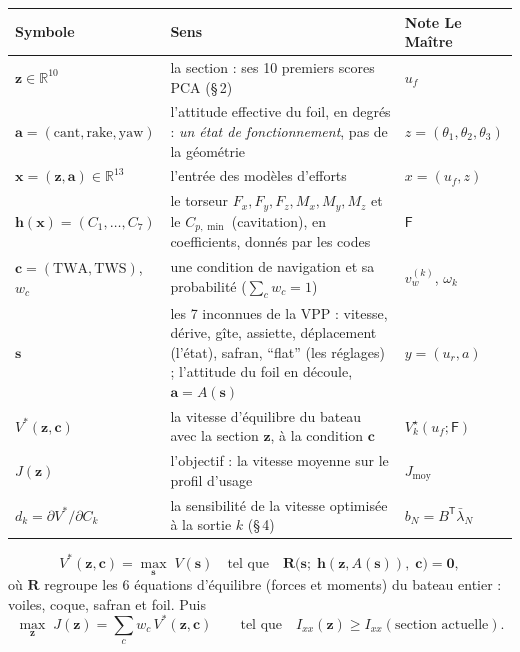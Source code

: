 \documentclass[11pt,a4paper]{article}
\newcommand{\vx}{\bm{x}}
\newcommand{\vz}{\bm{z}}
\newcommand{\va}{\bm{a}}
\newcommand{\vc}{\bm{c}}
\newcommand{\vs}{\bm{s}}
\newcommand{\vh}{\bm{h}}
\newcommand{\tp}{^{\mathsf{T}}}
\begin{document}
\begin{center}\small
\begin{tabularx}{\linewidth}{@{}l>{\raggedright\arraybackslash}Xl@{}}
\toprule
Symbole & Sens & Note Le Maître \\
\midrule
$\vz\in\mathbb R^{10}$ & la section : ses 10 premiers scores PCA (§\,2) & $u_f$ \\
$\va=(\text{cant},\text{rake},\text{yaw})$ & l'attitude effective du foil, en degrés : \emph{un état de fonctionnement}, pas de la géométrie & $z=(\theta_1,\theta_2,\theta_3)$ \\
$\vx=(\vz,\va)\in\mathbb R^{13}$ & l'entrée des modèles d'efforts & $x=(u_f,z)$ \\
$\vh(\vx)=(C_1,\dots,C_7)$ & le torseur $F_x,F_y,F_z,M_x,M_y,M_z$ et le $C_{p,\min}$ (cavitation), en coefficients, donnés par les codes & $\mathsf F$ \\
$\vc=(\text{TWA},\text{TWS})$, $w_c$ & une condition de navigation et sa probabilité ($\sum_c w_c=1$) & $v_w^{(k)}$, $\omega_k$ \\
$\vs$ & les 7 inconnues de la VPP : vitesse, dérive, gîte, assiette, déplacement (l'état), safran, \enquote{flat} (les réglages) ; l'attitude du foil en découle, $\va=A(\vs)$ & $y=(u_r,a)$ \\
$V^\ast(\vz,\vc)$ & la vitesse d'équilibre du bateau avec la section $\vz$, à la condition $\vc$ & $V^\star_k(u_f;\mathsf F)$ \\
$J(\vz)$ & l'objectif : la vitesse moyenne sur le profil d'usage & $J_{\text{moy}}$ \\
$d_k=\partial V^\ast/\partial C_k$ & la sensibilité de la vitesse optimisée à la sortie $k$ (§\,4) & $b_N=B\tp\bar\lambda_N$ \\
\bottomrule
\end{tabularx}
\end{center}

\begin{theorie}
\begin{equation}\label{eq:vstar}
V^\ast(\vz,\vc)=\max_{\vs}\;V(\vs)\quad\text{tel que}\quad
\bm R\big(\vs;\;\vh(\vz,A(\vs)),\;\vc\big)=\bm 0,
\end{equation}
où $\bm R$ regroupe les 6 équations d'équilibre (forces et moments) du bateau entier : voiles, coque, safran
et foil. Puis
\begin{equation}\label{eq:objectif}
\max_{\vz}\;J(\vz)=\sum_c w_c\,V^\ast(\vz,\vc)\qquad\text{tel que}\quad I_{xx}(\vz)\ge I_{xx}(\text{section actuelle}).
\end{equation}
\end{theorie}
\end{document}
